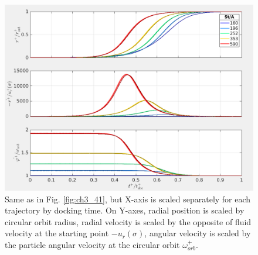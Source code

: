 \documentclass[../main.tex]{subfiles}
\begin{document}
\begin{figure}
\centering
\noindent \includegraphics[width=30pc]{gfx/orbit_docking_vel_traj_in_time_scal.png}
\caption{Same as in Fig. \ref{fig:ch3_41}, but X-axis is scaled separately for each trajectory by docking time. On Y-axes, radial position is scaled by circular orbit radius, radial velocity is scaled by the opposite of fluid velocity at the starting point $-u_r(\sigma)$, angular velocity is scaled by the particle angular velocity at the circular orbit $\omega^+_{orb}$.}
\label{fig:ch3_43}
\end{figure}
\end{document}
